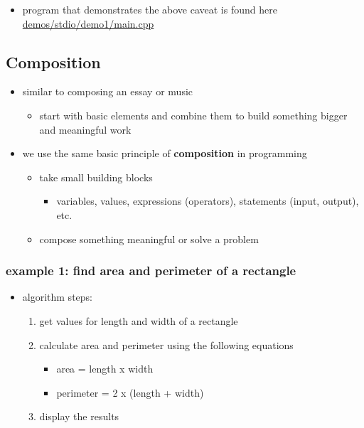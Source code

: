 \documentclass[11pt]{article}
\providecommand{\tightlist}{%
      \setlength{\itemsep}{0pt}\setlength{\parskip}{0pt}}
\begin{document}
\begin{itemize}
\tightlist
\item
  program that demonstrates the above caveat is found here
  \url{demos/stdio/demo1/main.cpp}
\end{itemize}

    \hypertarget{composition}{%
\subsection{Composition}\label{composition}}

\begin{itemize}
\tightlist
\item
  similar to composing an essay or music

  \begin{itemize}
  \tightlist
  \item
    start with basic elements and combine them to build something bigger
    and meaningful work
  \end{itemize}
\item
  we use the same basic principle of \textbf{composition} in programming

  \begin{itemize}
  \tightlist
  \item
    take small building blocks

    \begin{itemize}
    \tightlist
    \item
      variables, values, expressions (operators), statements (input,
      output), etc.
    \end{itemize}
  \item
    compose something meaningful or solve a problem
  \end{itemize}
\end{itemize}

\hypertarget{example-1-find-area-and-perimeter-of-a-rectangle}{%
\subsubsection{example 1: find area and perimeter of a
rectangle}\label{example-1-find-area-and-perimeter-of-a-rectangle}}

\begin{itemize}
\tightlist
\item
  algorithm steps:

  \begin{enumerate}
  \def\labelenumi{\arabic{enumi}.}
  \tightlist
  \item
    get values for length and width of a rectangle
  \item
    calculate area and perimeter using the following equations

    \begin{itemize}
    \tightlist
    \item
      area = length x width
    \item
      perimeter = 2 x (length + width)
    \end{itemize}
  \item
    display the results
  \end{enumerate}
\end{itemize}
\end{document}
